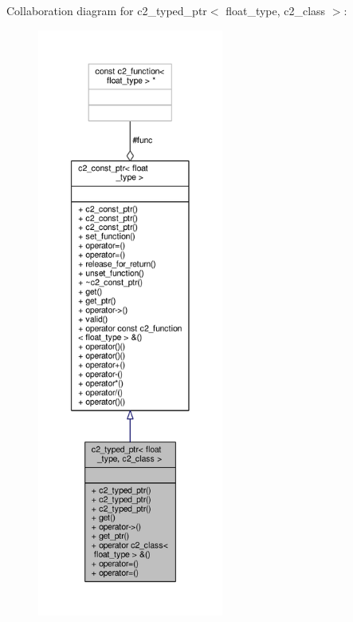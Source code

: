 Collaboration diagram for c2\+\_\+typed\+\_\+ptr$<$ float\+\_\+type, c2\+\_\+class $>$\+:
\nopagebreak
\begin{figure}[H]
\begin{center}
\leavevmode
\includegraphics[height=550pt]{classc2__typed__ptr__coll__graph}
\end{center}
\end{figure}

